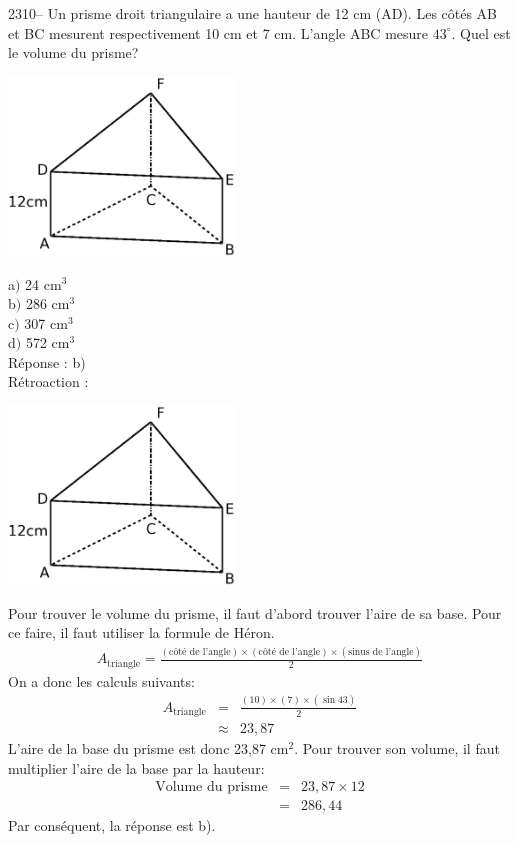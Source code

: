 \documentclass[letterpaper, 12pt]{article}
\begin{document}
2310-- Un prisme droit triangulaire a une hauteur de 12 cm (AD). Les c\^ot\'es AB et BC mesurent respectivement 10 cm et 7 cm. L'angle ABC mesure $43^{\circ}$. Quel est le volume du prisme? \\
\begin{center}
 \includegraphics[width=6cm,bb=14 14 500 399]{Q2310.eps}
\end{center}

a$)$ 24 cm$^{3}$\\
b$)$ 286 cm$^{3}$\\
c$)$ 307 cm$^{3}$\\
d$)$ 572 cm$^{3}$\\

R\'eponse : b)\\

R\'etroaction :\\
\begin{center}
 \includegraphics[width=6cm,bb=14 14 500 399]{Q2310.eps}
\end{center}
Pour trouver le volume du prisme, il faut d'abord trouver l'aire de sa base. Pour ce faire, il faut utiliser la formule de H\'eron.
\begin{eqnarray*}
A_{\textrm{triangle}}=\frac{(\textrm{c\^ot\'e de l'angle})\times(\textrm{c\^ot\'e de l'angle})\times(\textrm{sinus de l'angle})}{2}
\end{eqnarray*}
On a donc les calculs suivants:
 \begin{eqnarray*}
A_{\textrm{triangle}}&=&\frac{(10)\times(7)\times(\sin{43})}{2}\\
&\approx&23,87
\end{eqnarray*}
L'aire de la base du prisme est donc 23,87 cm$^{2}$. Pour trouver son volume, il faut multiplier l'aire de la base par la hauteur:
 \begin{eqnarray*}
\textrm{Volume du prisme}&=&23,87\times12\\
&=&286,44
\end{eqnarray*}
Par cons\'equent, la r\'eponse est b).\\
\end{document}
